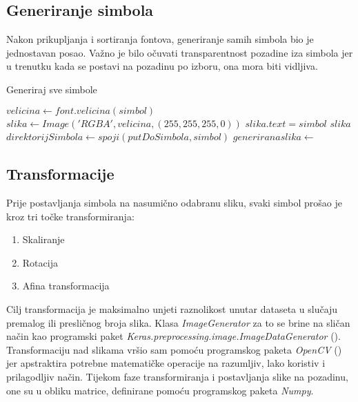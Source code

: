 \subsection{Generiranje simbola}
Nakon prikupljanja i sortiranja fontova, generiranje samih simbola bio je jednostavan posao.
Važno je bilo očuvati transparentnost pozadine iza simbola jer u trenutku kada se postavi na pozadinu po izboru, ona mora biti vidljiva.
\begin{algorithm}
\caption{Generiraj sve simbole}
\begin{algorithmic}[1]
		\State $velicina \gets font.velicina(simbol)$
		\State $slika \gets Image('RGBA', velicina, (255, 255, 255, 0))$
		\State $slika.text = simbol$
		\State \Return $slika$
	\EndFunction
				\State $direktorijSimbola \leftarrow spoji(putDoSimbola, simbol)$
					\State {}
				\EndIf
				\State $generirana slika \gets$ 
				\State {}
			\EndFor
		\EndFor
	\EndFunction
\end{algorithmic}
\end{algorithm}

\subsection{Transformacije}
Prije postavljanja simbola na nasumično odabranu sliku, svaki simbol prošao je kroz tri točke transformiranja:
\begin{enumerate}
\item Skaliranje
\item Rotacija
\item Afina transformacija
\end{enumerate}
Cilj transformacija je maksimalno unjeti raznolikost unutar dataseta u slučaju premalog ili presličnog broja slika.
Klasa \emph{ImageGenerator} za to se brine na sličan način kao programski paket \emph{Keras.preprocessing.image.ImageDataGenerator} (\cite{Keras.io}).
Transformaciju nad slikama vršio sam pomoću programskog paketa \emph{OpenCV} (\cite{OpenCV}) jer apstraktira potrebne matematičke operacije na razumljiv, lako koristiv i prilagodljiv način.
Tijekom faze transformiranja i postavljanja slike na pozadinu, one su u obliku matrice, definirane pomoću programskog paketa \emph{Numpy}.
